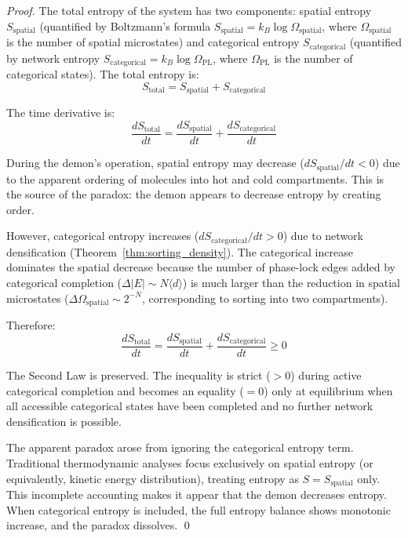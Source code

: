 \documentclass[12pt,a4paper]{article}
\theoremstyle{definition}
\theoremstyle{remark}
\begin{document}
\begin{proof}
The total entropy of the system has two components: spatial entropy $S_{\text{spatial}}$ (quantified by Boltzmann's formula $S_{\text{spatial}} = k_B \log \Omega_{\text{spatial}}$, where $\Omega_{\text{spatial}}$ is the number of spatial microstates) and categorical entropy $S_{\text{categorical}}$ (quantified by network entropy $S_{\text{categorical}} = k_B \log \Omega_{\text{PL}}$, where $\Omega_{\text{PL}}$ is the number of categorical states). The total entropy is:
\begin{equation}
S_{\text{total}} = S_{\text{spatial}} + S_{\text{categorical}}
\end{equation}

The time derivative is:
\begin{equation}
\frac{dS_{\text{total}}}{dt} = \frac{dS_{\text{spatial}}}{dt} + \frac{dS_{\text{categorical}}}{dt}
\end{equation}

During the demon's operation, spatial entropy may decrease ($dS_{\text{spatial}}/dt < 0$) due to the apparent ordering of molecules into hot and cold compartments. This is the source of the paradox: the demon appears to decrease entropy by creating order.

However, categorical entropy increases ($dS_{\text{categorical}}/dt > 0$) due to network densification (Theorem~\ref{thm:sorting_density}). The categorical increase dominates the spatial decrease because the number of phase-lock edges added by categorical completion ($\Delta |E| \sim N \langle d \rangle$) is much larger than the reduction in spatial microstates ($\Delta \Omega_{\text{spatial}} \sim 2^{-N}$, corresponding to sorting into two compartments).

Therefore:
\begin{equation}
\frac{dS_{\text{total}}}{dt} = \frac{dS_{\text{spatial}}}{dt} + \frac{dS_{\text{categorical}}}{dt} \geq 0
\end{equation}

The Second Law is preserved. The inequality is strict ($> 0$) during active categorical completion and becomes an equality ($= 0$) only at equilibrium when all accessible categorical states have been completed and no further network densification is possible.

The apparent paradox arose from ignoring the categorical entropy term. Traditional thermodynamic analyses focus exclusively on spatial entropy (or equivalently, kinetic energy distribution), treating entropy as $S = S_{\text{spatial}}$ only. This incomplete accounting makes it appear that the demon decreases entropy. When categorical entropy is included, the full entropy balance shows monotonic increase, and the paradox dissolves. \qed
\end{proof}
\end{document}

